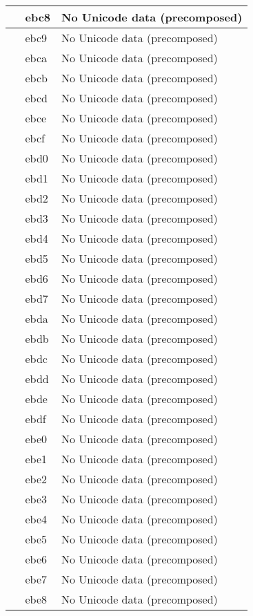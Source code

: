 \documentclass[12pt,letterpaper,openany]{book}
\begin{document}
\begin{center}
\begin{supertabular}{|m{0.25in}|m{0.5in}|m{4in}|}
 & ebc8 & No Unicode data (precomposed)\\\hline
 & ebc9 & No Unicode data (precomposed)\\\hline
 & ebca & No Unicode data (precomposed)\\\hline
 & ebcb & No Unicode data (precomposed)\\\hline
 & ebcd & No Unicode data (precomposed)\\\hline
 & ebce & No Unicode data (precomposed)\\\hline
 & ebcf & No Unicode data (precomposed)\\\hline
 & ebd0 & No Unicode data (precomposed)\\\hline
 & ebd1 & No Unicode data (precomposed)\\\hline
 & ebd2 & No Unicode data (precomposed)\\\hline
 & ebd3 & No Unicode data (precomposed)\\\hline
 & ebd4 & No Unicode data (precomposed)\\\hline
 & ebd5 & No Unicode data (precomposed)\\\hline
 & ebd6 & No Unicode data (precomposed)\\\hline
 & ebd7 & No Unicode data (precomposed)\\\hline
 & ebda & No Unicode data (precomposed)\\\hline
 & ebdb & No Unicode data (precomposed)\\\hline
 & ebdc & No Unicode data (precomposed)\\\hline
 & ebdd & No Unicode data (precomposed)\\\hline
 & ebde & No Unicode data (precomposed)\\\hline
 & ebdf & No Unicode data (precomposed)\\\hline
 & ebe0 & No Unicode data (precomposed)\\\hline
 & ebe1 & No Unicode data (precomposed)\\\hline
 & ebe2 & No Unicode data (precomposed)\\\hline
 & ebe3 & No Unicode data (precomposed)\\\hline
 & ebe4 & No Unicode data (precomposed)\\\hline
 & ebe5 & No Unicode data (precomposed)\\\hline
 & ebe6 & No Unicode data (precomposed)\\\hline
 & ebe7 & No Unicode data (precomposed)\\\hline
 & ebe8 & No Unicode data (precomposed)\\\hline

\end{supertabular}
\end{center}
\end{document}
